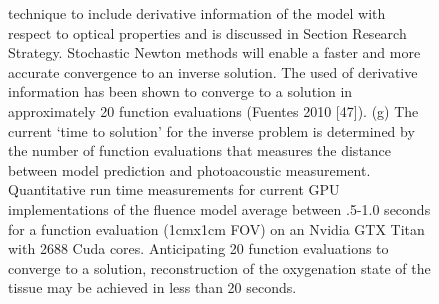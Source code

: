 \documentclass{article}         %
\theoremstyle{definition}
\theoremstyle{remark}
\begin{document}
\begin{figure}[h]
{technique to include derivative information of the model with respect to
optical properties and is discussed in Section Research Strategy. Stochastic
Newton methods will enable a faster and more accurate convergence to an
inverse solution. The used of derivative information has been shown to
converge to a solution in approximately 20 function evaluations (Fuentes
2010 [47]). (g) The current ‘time to solution’ for the inverse problem is
determined by the number of function evaluations that measures the distance
between model prediction and photoacoustic measurement. Quantitative run
time measurements for current GPU implementations of the fluence model
average between .5-1.0 seconds for a function evaluation (1cmx1cm FOV) on an
Nvidia GTX Titan with 2688 Cuda cores. Anticipating 20 function evaluations
to converge to a solution, reconstruction of the oxygenation state of the
tissue may be achieved in less than 20 seconds.
} \label{SolutionComparison}
\end{figure}
\nocite{*}


\end{document}
